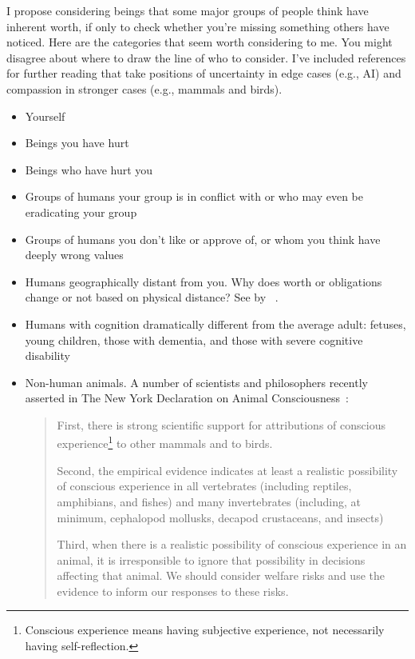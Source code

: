 \documentclass[11pt,oneside]{book}
\let\cite\parencite
\newcommand{\prosecite}[1]{\citetitle{#1} by \citefullauthor{#1}~\cite{#1}}
\begin{document}
I propose considering beings that some major groups of people think have inherent worth, if only to check whether you're missing something others have noticed. Here are the categories that seem worth considering to me. You might disagree about where to draw the line of who to consider. I've included references for further reading that take positions of uncertainty in edge cases (e.g., AI) and compassion in stronger cases (e.g., mammals and birds).
\begin{itemize}
    \item Yourself
    \item Beings you have hurt
    \item Beings who have hurt you
    \item Groups of humans your group is in conflict with or who may even be eradicating your group
    \item Groups of humans you don't like or approve of, or whom you think have deeply wrong values
    \item Humans geographically distant from you. Why does worth or obligations change or not based on physical distance? See \prosecite{singer2017famine}.
    \item Humans with cognition dramatically different from the average adult: fetuses, young children, those with dementia, and those with severe cognitive disability
    \item Non-human animals. A number of scientists and philosophers recently asserted in The New York Declaration on Animal Consciousness~\cite{newYorkAnimal}:
    \begin{quotation}
        First, there is strong scientific support for attributions of conscious experience\footnote{Conscious experience means having subjective experience, not necessarily having self-reflection.} to other mammals and to birds.

        Second, the empirical evidence indicates at least a realistic possibility of conscious experience in all vertebrates (including reptiles, amphibians, and fishes) and many invertebrates (including, at minimum, cephalopod mollusks, decapod crustaceans, and insects)

        Third, when there is a realistic possibility of conscious experience in an animal, it is irresponsible to ignore that possibility in decisions affecting that animal. We should consider welfare risks and use the evidence to inform our responses to these risks.
    \end{quotation}
    

\end{itemize}
\end{document}
